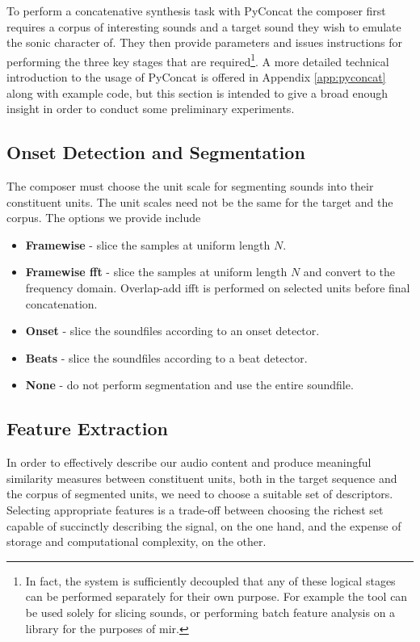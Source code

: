 {{{{{{{{To perform a concatenative synthesis task with PyConcat the composer first requires a corpus of interesting sounds and a target sound they wish to emulate the sonic character of. They then provide parameters and issues instructions for performing the three key stages that are required\footnote{In fact, the system is sufficiently decoupled that any of these logical stages can be performed separately for their own purpose. For example the tool can be used solely for slicing sounds, or performing batch feature analysis on a library for the purposes of \acrshort{mir}.}. A more detailed technical introduction to the usage of PyConcat is offered in Appendix \ref{app:pyconcat} along with example code, but this section is intended to give a broad enough insight in order to conduct some preliminary experiments. 

\subsection{Onset Detection and Segmentation}

The composer must choose the unit scale for segmenting sounds into their constituent units. The unit scales need not be the same for the target and the corpus. The options we provide include

\begin{itemize}
  \item \textbf{Framewise} - slice the samples at uniform length $N$.
  \item \textbf{Framewise \acrshort{fft}} - slice the samples at uniform length $N$ and convert to the frequency domain. Overlap-add \acrshort{ifft} is performed on selected units before final concatenation.
  \item \textbf{Onset} - slice the soundfiles according to an onset detector.
  \item \textbf{Beats} - slice the soundfiles according to a beat detector.
  \item \textbf{None} - do not perform segmentation and use the entire soundfile. 
\end{itemize}

\subsection{Feature Extraction}

In order to effectively describe our audio content and produce meaningful similarity measures between constituent units, both in the target sequence and the corpus of segmented units, we need to choose a suitable set of descriptors. Selecting appropriate features is a trade-off between choosing the richest set capable of succinctly describing the signal, on the one hand, and the expense of storage and computational complexity, on the other. 

}}}}}}}}
